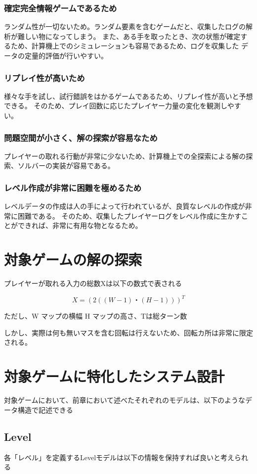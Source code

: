 \subsubsection{確定完全情報ゲームであるため}
ランダム性が一切ないため。ランダム要素を含むゲームだと、収集したログの解析が難しい物になってしまう。
また、ある手を取ったとき、次の状態が確定するため、計算機上でのシミュレーションも容易であるため、ログを収集した
データの定量的評価が行いやすい。
\subsubsection{リプレイ性が高いため}
様々な手を試し、試行錯誤をはかるゲームであるため、リプレイ性が高いと予想できる。
そのため、プレイ回数に応じたプレイヤー力量の変化を観測しやすい。

\subsubsection{問題空間が小さく、解の探索が容易なため}
プレイヤーの取れる行動が非常に少ないため、計算機上での全探索による解の探索、ソルバーの実装が容易である。

\subsubsection{レベル作成が非常に困難を極めるため}
レベルデータの作成は人の手によって行われているが、良質なレベルの作成が非常に困難である。
そのため、収集したプレイヤーログをレベル作成に生かすことができれば、非常に有用な物となるため。


\section{対象ゲームの解の探索}
プレイヤーが取れる入力の総数Xは以下の数式で表される

\[ X = (2((W-1)・(H-1)))^T \]

ただし、W マップの横幅 H マップの高さ、Tは総ターン数

しかし、実際は何も無いマスを含む回転は行えないため、回転カ所は非常に限定される。

\section{対象ゲームに特化したシステム設計}
対象ゲームにおいて、前章において述べたそれぞれのモデルは、以下のようなデータ構造で記述できる

\subsection{Level}
各「レベル」を定義するLevelモデルは以下の情報を保持すれば良いと考えられる

